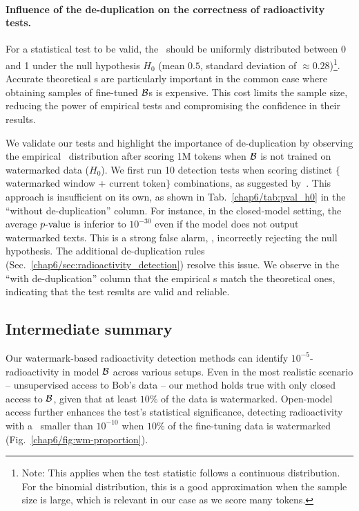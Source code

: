\paragraph{Influence of the de-duplication on the correctness of radioactivity tests.}\label{chap6/par:dedup-expe}
For a statistical test to be valid, the \pval\ should be uniformly distributed between 0 and 1 under the null hypothesis $H_0$ (mean $0.5$, standard deviation of $\approx0.28$)\footnote{
    Note: This applies when the test statistic follows a continuous distribution. 
    For the binomial distribution, this is a good approximation when the sample size is large, which is relevant in our case as we score many tokens.
}.
Accurate theoretical \pval s are particularly important in the common case where obtaining samples of fine-tuned $\mathcal B$s is expensive. 
This cost limits the sample size, reducing the power of empirical tests and compromising the confidence in their results. 

We validate our tests and highlight the importance of de-duplication by observing the empirical \pval\ distribution after scoring 1M tokens when $\mathcal B$ is not trained on watermarked data ($H_0$). 
We first run 10 detection tests when scoring distinct $\{$watermarked window + current token$\}$ combinations, as suggested by~\citep{kirchenbauer2023watermark, fernandez2023three}. 
This approach is insufficient on its own, as shown in Tab.~\ref{chap6/tab:pval_h0} in the ``without de-duplication'' column.
For instance,  in the closed-model setting, the average $p\textrm{-value}$ is inferior to $10^{-30}$ even if the model does not output watermarked texts.
This is a strong false alarm, \ie,  incorrectly rejecting the null hypothesis.
The additional de-duplication rules (Sec.~\ref{chap6/sec:radioactivity_detection}) resolve this issue. 
We observe in the ``with de-duplication'' column that the empirical \pval s match the theoretical ones, indicating that the test results are valid and reliable. 









\subsection{Intermediate summary}
Our watermark-based radioactivity detection methods can identify $10^{-5}$-radioactivity in model $\mathcal B$ across various setups. 
Even in the most realistic scenario -- unsupervised access to Bob's data -- our method holds true with only closed access to $\mathcal B$, given that at least $10\%$ of the data is watermarked. 
Open-model access further enhances the test's statistical significance, detecting radioactivity with a \pval\ smaller than $10^{-10}$ when $10\%$ of the fine-tuning data is watermarked (Fig.~\ref{chap6/fig:wm-proportion}).



